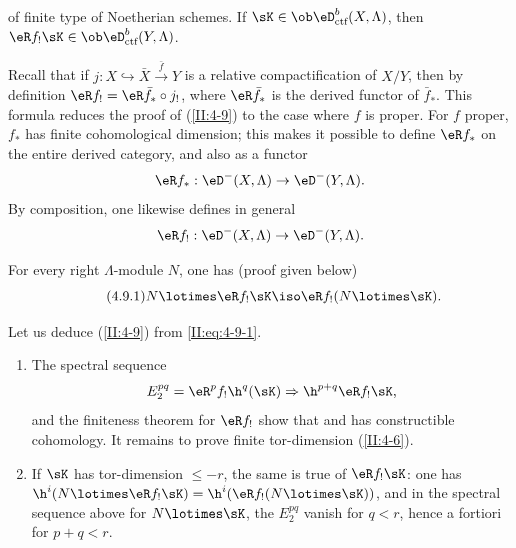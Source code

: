\begin{theorem_}\label{II:4-9}
 of finite type of Noetherian schemes.
If $\sK\in\ob\eD_\textnormal{ctf}^b(X,\Lambda)$, then
$\eR f_!\sK\in \ob\eD_\textnormal{ctf}^b(Y,\Lambda)$.
\end{theorem_}

Recall that if $j:X\hookrightarrow \bar X \xrightarrow{\bar f} Y$ is a
relative compactification of $X/Y$, then by definition
$\eR f_! = \eR \bar f_* \circ j_!$, where $\eR \bar f_*$ is the derived
functor of $\bar f_*$. This formula reduces the proof of (\ref{II:4-9}) to
the case where $f$ is proper. For $f$ proper, $f_*$ has finite cohomological
dimension; this makes it possible to define $\eR f_*$ on the entire derived
category, and also as a functor
\[
  \eR f_* : \eD^-(X,\Lambda) \to \eD^-(Y,\Lambda) \text{.}
\]
By composition, one likewise defines in general
\[
  \eR f_! : \eD^-(X,\Lambda) \to \eD^-(Y,\Lambda) \text{.}
\]

For every right $\Lambda$-module $N$, one has (proof given below)
\begin{equation*}\tag{4.9.1}\label{II:eq:4-9-1}
  N\lotimes \eR f_! \sK \iso \eR f_! (N\lotimes \sK) \text{.}
\end{equation*}

Let us deduce (\ref{II:4-9}) from \eqref{II:eq:4-9-1}.
\begin{enumerate}[\indent a)]
  \item The spectral sequence
    \[
      E_2^{p q} = \eR^p f_! \h^q(\sK) \Rightarrow \h^{p+q} \eR f_! \sK \text{,}
    \]
    and the finiteness theorem for $\eR f_!$ show that
     and has constructible cohomology.
    It remains to prove finite tor-dimension (\ref{II:4-6}).
  \item If $\sK$ has tor-dimension $\leqslant -r$, the same is true of
    $\eR f_! \sK$: one has
    $\h^i(N\lotimes \eR f_! \sK) = \h^i(\eR f_!(N\lotimes \sK))$, and in the
    spectral sequence above for $N\lotimes \sK$, the $E_2^{p q}$ vanish for
    $q<r$, hence a fortiori for $p+q<r$.
\end{enumerate}

